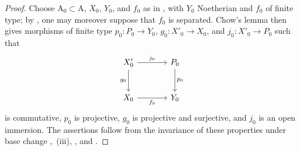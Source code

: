 \begin{proof}
Choose $\mathrm{A}_0\subset\mathrm{A}$, $X_0$, $Y_0$, and $f_0$ as in , with $Y_0$ Noetherian and $f_0$ of finite type; by , one may moreover suppose that $f_0$ is separated. Chow's lemma  then gives morphisms of finite type $p_0:P_0\to Y_0$, $g_0:X'_0\to X_0$, and $j_0:X'_0\to P_0$ such that
\[
\begin{tikzcd}[column sep=large,row sep=large]
X'_0 \arrow[r,"j_0"] \arrow[d,"g_0"'] & P_0 \arrow[d,"p_0"] \\
X_0 \arrow[r,"f_0"'] & Y_0
\end{tikzcd}
\]
is commutative, $p_0$ is projective, $g_0$ is projective and surjective, and $j_0$ is an open immersion. The assertions follow from the invariance of these properties under base change ,~(iii), , and .
\end{proof}

